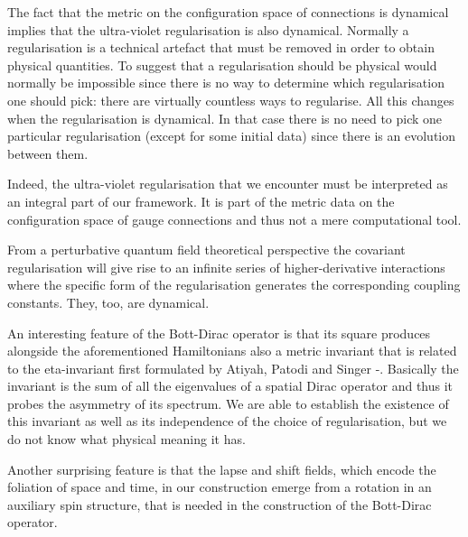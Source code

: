 \documentclass[12pt]{article}
\begin{document}
The fact that the metric on the configuration space of connections is dynamical implies that the ultra-violet regularisation is also dynamical. Normally a regularisation is a technical artefact that must be removed in order to obtain physical quantities. To suggest that a regularisation should be physical would normally be impossible since there is no way to determine which regularisation one should pick: there are virtually countless ways to regularise. All this changes when the regularisation is dynamical. In that case there is no need to pick one particular regularisation (except for some initial data) since there is an evolution between them. 

Indeed, the ultra-violet regularisation that we encounter must be interpreted as an integral part of our framework. It is part of the metric data on the configuration space of gauge connections and thus not a mere computational tool. 

From a perturbative quantum field theoretical perspective the covariant regularisation will give rise to an infinite series of higher-derivative interactions where the specific form of the regularisation generates the corresponding coupling constants. They, too, are dynamical.









An interesting feature of the Bott-Dirac operator is that its square produces alongside the aforementioned Hamiltonians also a metric invariant that is related to the eta-invariant first formulated by Atiyah, Patodi and Singer \cite{Atiyah}-\cite{AtiyahIII}. Basically the invariant is the sum of all the eigenvalues of a spatial Dirac operator and thus it probes the asymmetry of its spectrum. We are able to establish the existence of this invariant as well as its independence of the choice of regularisation, but we do not know what physical meaning it has. 

Another surprising feature is that the lapse and shift fields, which encode the foliation of space and time, in our construction emerge from a rotation in an auxiliary spin structure, that is needed in the construction of the Bott-Dirac operator. 
\end{document}
